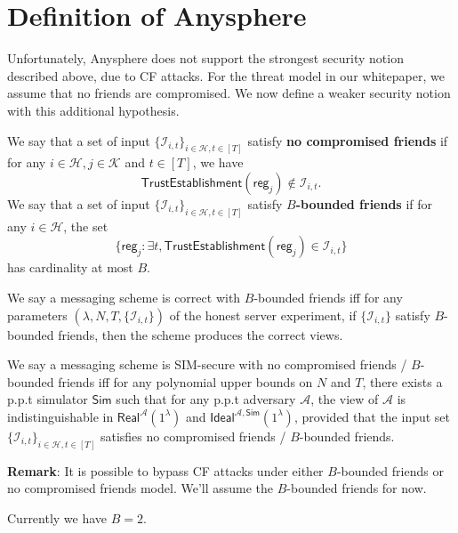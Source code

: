 \documentclass[sigconf, nonacm, balance=false, natbib=false, screen]{acmart}
\newcommand{\reg}{\mathsf{reg}}
\newcommand{\cK}{\mathcal{K}}
\newcommand{\Sim}{\mathsf{Sim}}
\newcommand{\cA}{\mathcal{A}}
\newcommand{\cI}{\mathcal{I}}
\newcommand{\cH}{\mathcal{H}}
\begin{document}
\section{Definition of Anysphere}
Unfortunately, Anysphere does not support the strongest security notion described above, due to CF attacks. For the threat model in our whitepaper, we assume that no friends are compromised. We now define a weaker security notion with this additional hypothesis.
\begin{definition}
We say that a set of input $\{\cI_{i, t}\}_{i \in \cH, t \in [T]}$ satisfy \textbf{no compromised friends} if for any $i \in \cH, j \in \cK$ and $t \in [T]$, we have
$$\mathsf{TrustEstablishment}(\reg_j) \notin \cI_{i, t}.$$
We say that a set of input $\{\cI_{i, t}\}_{i \in \cH, t \in [T]}$ satisfy \textbf{$B$-bounded friends} if for any $i \in \cH$, the set
$$\{\reg_j: \exists t, \mathsf{TrustEstablishment}(\reg_j) \in \cI_{i, t}\}$$
has cardinality at most $B$.

We say a messaging scheme is correct with $B$-bounded friends iff for any parameters $(\lambda, N, T, \{\cI_{i, t}\})$ of the honest server experiment, if $\{\cI_{i, t}\}$ satisfy $B$-bounded friends, then the scheme produces the correct views.

We say a messaging scheme is SIM-secure with no compromised friends / $B$-bounded friends iff for any polynomial upper bounds on $N$ and $T$, there exists a p.p.t simulator $\Sim$ such that for any p.p.t adversary $\cA$, the view of $\cA$ is indistinguishable in $\mathsf{Real}^{\cA}(1^{\lambda})$ and $\mathsf{Ideal}^{\cA, \mathsf{\Sim}}(1^{\lambda})$, provided that the input set $\{\cI_{i, t}\}_{i \in \cH, t \in [T]}$ satisfies no compromised friends / $B$-bounded friends.
\end{definition}
\textbf{Remark}: It is possible to bypass CF attacks under either $B$-bounded friends or no compromised friends model. We'll assume the $B$-bounded friends for now.

Currently we have $B = 2$.
\begin{figure}
\begin{framed}[h!]
\begin{definition}
\end{definition}
\end{framed}
\end{figure}
\end{document}
